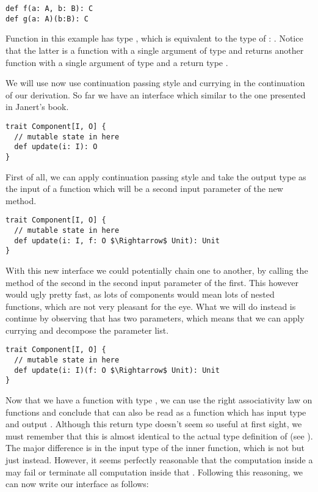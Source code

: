 \begin{lstlisting}[style=InlineScalaStyle]
def f(a: A, b: B): C
def g(a: A)(b:B): C
\end{lstlisting}

Function  in this example has type , which is equivalent to the type of : . Notice that the latter is a function with a single argument of type  and returns another function with a single argument of type  and a return type .

We will use now use continuation passing style and currying in the continuation of our derivation. So far we have an interface which similar to the one presented in Janert's book.

\begin{lstlisting}[style=InlineScalaStyle]
trait Component[I, O] {
  // mutable state in here
  def update(i: I): O
}
\end{lstlisting}

First of all, we can apply continuation passing style and take the output type  as the input of a function which will be a second input parameter of the new  method.

\begin{lstlisting}[style=InlineScalaStyle]
trait Component[I, O] {
  // mutable state in here
  def update(i: I, f: O $\Rightarrow$ Unit): Unit
}
\end{lstlisting}

With this new interface we could potentially chain one \comp to another, by calling the  method of the second \comp in the second input parameter of the first. This however would ugly pretty fast, as lots of components would mean lots of nested functions, which are not very pleasant for the eye. What we will do instead is continue by observing that  has two parameters, which means that we can apply currying and decompose the parameter list.

\begin{lstlisting}[style=InlineScalaStyle]
trait Component[I, O] {
  // mutable state in here
  def update(i: I)(f: O $\Rightarrow$ Unit): Unit
}
\end{lstlisting}

Now that we have a function  with type , we can use the right associativity law on functions and conclude that  can also be read as a function which has input type  and output . Although this return type doesn't seem so useful at first sight, we must remember that this is almost identical to the actual type definition of \obs (see ). The major difference is in the input type of the inner function, which is not  but just  instead. However, it seems perfectly reasonable that the computation inside a \comp may fail or terminate all computation inside that \comp. Following this reasoning, we can now write our interface as follows:

